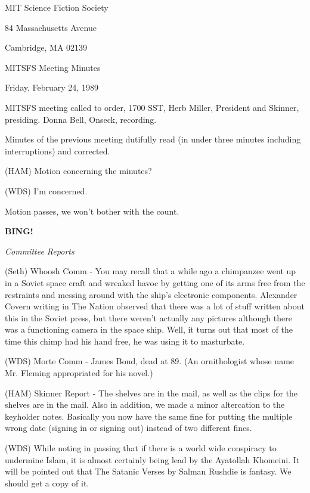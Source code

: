 \documentclass[12pt]{article}
\newcommand{\bing}{{\bf BING!} }
\newcommand{\goto}[1]{\bing \vskip 12pt \centerline{{\em{#1}}}}
\begin{document}
\begin{center}

MIT Science Fiction Society 

84 Massachusetts Avenue

Cambridge, MA 02139

\vspace{12pt}

MITSFS Meeting Minutes 

Friday, February 24, 1989

\end{center}
 
\vspace{18pt}

\setlength{\parskip}{6pt}

\noindent
MITSFS meeting called to order, 1700 SST, Herb Miller, President and Skinner, presiding. Donna Bell, Onseck, recording.

Minutes of the previous meeting dutifully read (in under three minutes including interruptions) and corrected.

(HAM) Motion concerning the minutes?

(WDS) I'm concerned.

Motion passes, we won't bother with the count.

\goto{Committee Reports}

(Seth) Whoosh Comm - You may recall that a while ago a chimpanzee went up in a Soviet space craft and wreaked havoc by getting one of its arms free from the restraints and messing around with the ship's electronic components.  Alexander Covern writing in The Nation observed that there was a lot of stuff written about this in the Soviet press, but there weren't actually any pictures although there was a functioning camera in the space ship.  Well, it turns out that most of the time this chimp had his hand free, he was using it to masturbate.

(WDS) Morte Comm - James Bond, dead at 89. (An ornithologist whose name Mr. Fleming appropriated for his novel.)

(HAM) Skinner Report - The shelves are in the mail, as well as the clips for the shelves are in the mail. Also in addition, we made a minor altercation to the keyholder notes. Basically you now have the same fine for putting the multiple wrong date (signing in or signing out) instead of two different fines.

(WDS) While noting in passing that if there is a world wide conspiracy to undermine Islam, it is almost certainly being lead by the Ayatollah Khomeini. It will be pointed out that The Satanic Verses by Salman Rushdie is fantasy. We should get a copy of it.
\end{document}

